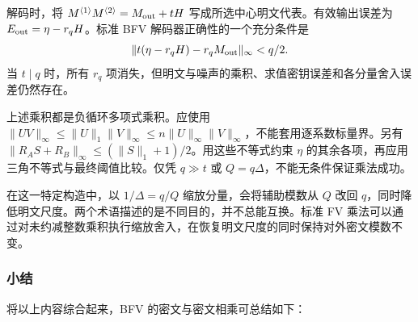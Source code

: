 解码时，将 $M^{\langle1\rangle}M^{\langle2\rangle}=M_{\rm out}+tH$ 写成所选中心明文代表。有效输出误差为 $E_{\rm out}=\eta-r_qH$。标准 BFV 解码器正确性的一个充分条件是
\[
\|t(\eta-r_qH)-r_qM_{\rm out}\|_\infty<q/2.
\]
当 $t\mid q$ 时，所有 $r_q$ 项消失，但明文与噪声的乘积、求值密钥误差和各分量舍入误差仍然存在。

上述乘积都是负循环多项式乘积。应使用 $\|UV\|_\infty\leq\|U\|_1\|V\|_\infty\leq n\|U\|_\infty\|V\|_\infty$，不能套用逐系数标量界。另有 $\|R_AS+R_B\|_\infty\leq(\|S\|_1+1)/2$。用这些不等式约束 $\eta$ 的其余各项，再应用三角不等式与最终阈值比较。仅凭 $q\gg t$ 或 $Q=q\Delta$，不能无条件保证乘法成功。

在这一特定构造中，以 $1/\Delta=q/Q$ 缩放分量，会将辅助模数从 $Q$ 改回 $q$，同时降低明文尺度。两个术语描述的是不同目的，并不总能互换。标准 FV 乘法可以通过对未约减整数乘积执行缩放舍入，在恢复明文尺度的同时保持对外密文模数不变。

\subsubsection{小结}
\label{subsubsec:bfv-mult-cipher-summary}

将以上内容综合起来，BFV 的密文与密文相乘可总结如下：

